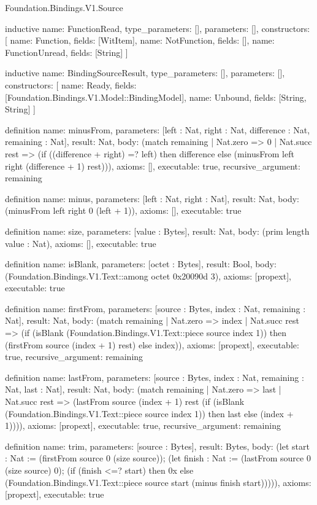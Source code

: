\begin{lexlean}{Foundation.Bindings.V1.Source}
\begin{semanticmodule}
inductive{
  name: FunctionRead,
  type_parameters: [],
  parameters: [],
  constructors: [
    {name: Function, fields: [WitItem]},
    {name: NotFunction, fields: []},
    {name: FunctionUnread, fields: [String]}
  ]
}

inductive{
  name: BindingSourceResult,
  type_parameters: [],
  parameters: [],
  constructors: [
    {name: Ready, fields: [Foundation.Bindings.V1.Model::BindingModel]},
    {name: Unbound, fields: [String, String]}
  ]
}

definition{
  name: minusFrom,
  parameters: [left : Nat, right : Nat, difference : Nat, remaining : Nat],
  result: Nat,
  body: (match remaining
    | Nat.zero => 0
    | Nat.succ rest => (if ((difference + right) =? left) then difference else (minusFrom left right (difference + 1) rest))),
  axioms: [],
  executable: true,
  recursive_argument: remaining
}

definition{
  name: minus,
  parameters: [left : Nat, right : Nat],
  result: Nat,
  body: (minusFrom left right 0 (left + 1)),
  axioms: [],
  executable: true
}

definition{
  name: size,
  parameters: [value : Bytes],
  result: Nat,
  body: (prim length value : Nat),
  axioms: [],
  executable: true
}

definition{
  name: isBlank,
  parameters: [octet : Bytes],
  result: Bool,
  body: (Foundation.Bindings.V1.Text::among octet 0x20090d 3),
  axioms: [propext],
  executable: true
}

definition{
  name: firstFrom,
  parameters: [source : Bytes, index : Nat, remaining : Nat],
  result: Nat,
  body: (match remaining
    | Nat.zero => index
    | Nat.succ rest => (if (isBlank (Foundation.Bindings.V1.Text::piece source index 1)) then (firstFrom source (index + 1) rest) else index)),
  axioms: [propext],
  executable: true,
  recursive_argument: remaining
}

definition{
  name: lastFrom,
  parameters: [source : Bytes, index : Nat, remaining : Nat, last : Nat],
  result: Nat,
  body: (match remaining
    | Nat.zero => last
    | Nat.succ rest => (lastFrom source (index + 1) rest (if (isBlank (Foundation.Bindings.V1.Text::piece source index 1)) then last else (index + 1)))),
  axioms: [propext],
  executable: true,
  recursive_argument: remaining
}

definition{
  name: trim,
  parameters: [source : Bytes],
  result: Bytes,
  body: (let start : Nat := (firstFrom source 0 (size source)); (let finish : Nat := (lastFrom source 0 (size source) 0); (if (finish <=? start) then 0x else (Foundation.Bindings.V1.Text::piece source start (minus finish start))))),
  axioms: [propext],
  executable: true
}


\end{semanticmodule}
\end{lexlean}
